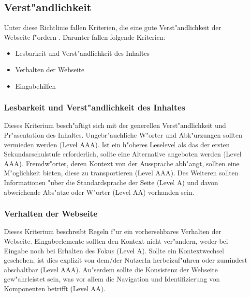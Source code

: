 \documentclass[a4paper,bibtotoc,oneside]{scrbook}
\begin{document}
\subsection{Verst"andlichkeit}
Unter diese Richtlinie fallen Kriterien, die eine gute Verst"andlichkeit der Webseite f"ordern \cite[Abschnitt 3]{wcag2}. Darunter fallen folgende Kriterien: 

\begin{itemize}
\item Lesbarkeit und Verst"andlichkeit des Inhaltes \cite[Abschnitt 3.1]{wcag2}
\item Verhalten der Webseite \cite[Abschnitt 3.2]{wcag2}
\item Eingabehilfen \cite[Abschnitt 3.3]{wcag2}
\end{itemize}

\subsubsection{Lesbarkeit und Verst"andlichkeit des Inhaltes}
Dieses Kriterium besch"aftigt sich mit der generellen Verst"andlichkeit und Pr"asentation des Inhaltes. Ungebr"auchliche W"orter und Abk"urzungen sollten vermieden werden (Level AAA). Ist ein h"oheres Leselevel als das der ersten Sekundarschulstufe erforderlich, sollte eine Alternative angeboten werden (Level AAA). Fremdw"orter, deren Kontext von der Aussprache abh"angt, sollten eine M"oglichkeit bieten, diese zu transportieren (Level AAA). Des Weiteren sollten Informationen "uber die Standardsprache der Seite (Level A) und davon abweichende Abs"atze oder W"orter (Level AA) vorhanden sein. \cite[Abschnitt 3.1]{wcag2}

\subsubsection{Verhalten der Webseite}
Dieses Kriterium beschreibt Regeln f"ur ein vorhersehbares Verhalten der Webseite. Eingabeelemente sollten den Kontext nicht ver"andern, weder bei Eingabe noch bei Erhalten des Fokus (Level A). Sollte ein Kontextwechsel geschehen, ist dies explizit von dem/der NutzerIn herbeizuf"uhren oder zumindest abschaltbar (Level AAA). Au"serdem sollte die Konsistenz der Webseite gew"ahrleistet sein, was vor allem die Navigation und Identifizierung von Komponenten betrifft (Level AA). \cite[Abschnitt 3.2]{wcag2}
\end{document}
